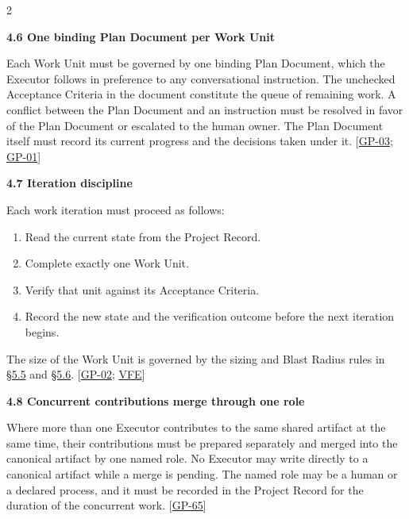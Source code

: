 \begin{multicols}{2}
\hypertarget{nss-4.6}{}

\par\smallskip\noindent\textbf{4.6 One binding Plan Document per Work Unit}\par\nopagebreak

Each Work Unit must be governed by one binding Plan Document, which the Executor follows in preference to any conversational instruction. The unchecked Acceptance Criteria in the document constitute the queue of remaining work. A conflict between the Plan Document and an instruction must be resolved in favor of the Plan Document or escalated to the human owner. The Plan Document itself must record its current progress and the decisions taken under it. [\hyperlink{gp-03}{GP-03}; \hyperlink{gp-01}{GP-01}]

\hypertarget{nss-4.7}{}

\par\smallskip\noindent\textbf{4.7 Iteration discipline}\par\nopagebreak

Each work iteration must proceed as follows:

\begin{enumerate}\setlength{\itemsep}{0pt}\setlength{\parskip}{0pt}

\item Read the current state from the Project Record.

\item Complete exactly one Work Unit.

\item Verify that unit against its Acceptance Criteria.

\item Record the new state and the verification outcome before the next iteration begins.

\end{enumerate}

The size of the Work Unit is governed by the sizing and Blast Radius rules in \hyperlink{nss-5.5}{\S5.5} and \hyperlink{nss-5.6}{\S5.6}. [\hyperlink{gp-02}{GP-02}; \hyperlink{gp-VFE}{VFE}]

\hypertarget{nss-4.8}{}

\par\smallskip\noindent\textbf{4.8 Concurrent contributions merge through one role}\par\nopagebreak

Where more than one Executor contributes to the same shared artifact at the same time, their contributions must be prepared separately and merged into the canonical artifact by one named role. No Executor may write directly to a canonical artifact while a merge is pending. The named role may be a human or a declared process, and it must be recorded in the Project Record for the duration of the concurrent work. [\hyperlink{gp-65}{GP-65}]


\end{multicols}

